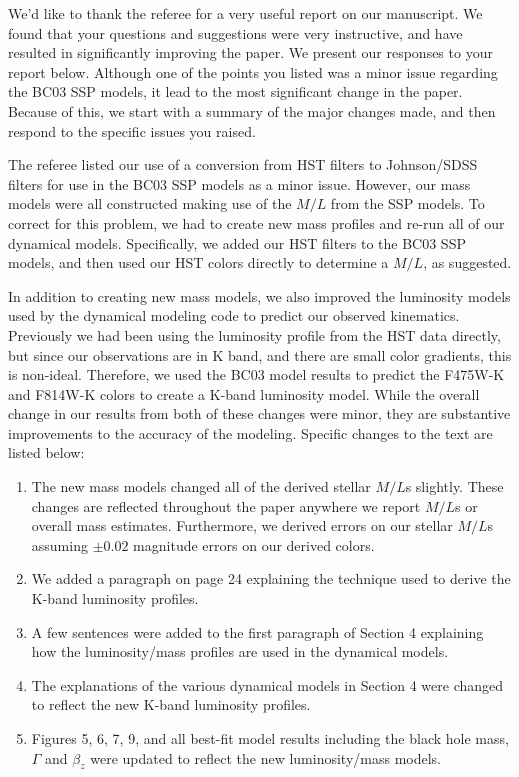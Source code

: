 \documentclass[11pt]{article}
\begin{document}
We'd like to thank the referee for a very useful report on our manuscript.   We found that your questions and suggestions were very instructive, and have resulted in significantly improving the paper. We present our responses to your report below. Although one of the points you listed was a minor issue regarding the BC03 SSP models, it lead to the most significant change in the paper. Because of this, we start with a summary of the major changes made, and then respond to the specific issues you raised. 
\vspace{0.5cm}

The referee listed our use of a conversion from HST filters to Johnson/SDSS filters for use in the BC03 SSP models as a minor issue. However, our mass models were all constructed making use of the $M/L$ from the SSP models. To correct for this problem, we had to create new mass profiles and re-run all of our dynamical models. Specifically, we added our HST filters to the BC03 SSP models, and then used our HST colors directly to determine a $M/L$, as suggested.

In addition to creating new mass models, we also improved the luminosity models used by the dynamical modeling code to predict our observed kinematics.  Previously we had been using the luminosity profile from the HST data directly, but since our observations are in K band, and there are small color gradients, this is non-ideal.  Therefore, we used the BC03 model results to predict the F475W-K and F814W-K colors to create a K-band luminosity model.  While the overall change  in our results from both of these changes were minor, they are substantive improvements to the accuracy of the modeling.  Specific changes to the text are listed below:

\begin{enumerate}
\item The new mass models changed all of the derived stellar $M/L$s slightly. These changes are reflected throughout the paper anywhere we report $M/L$s or overall mass estimates. Furthermore, we derived errors on our stellar $M/L$s assuming $\pm0.02$ magnitude errors on our derived colors.
\item We added a paragraph on page 24 explaining the technique used to derive the K-band luminosity profiles.
\item A few sentences were added to the first paragraph of Section 4 explaining how the luminosity/mass profiles are used in the dynamical models.
\item The explanations of the various dynamical models in Section 4 were changed to reflect the new K-band luminosity profiles.
\item Figures 5, 6, 7, 9, and all best-fit model results including the black hole mass, $\Gamma$ and $\beta_z$ were updated to reflect the new luminosity/mass models.
\end{enumerate}
\end{document}
